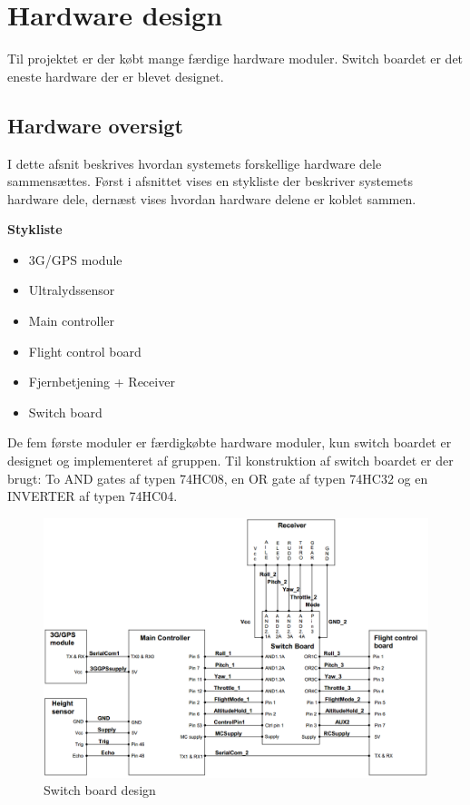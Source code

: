 \section{Hardware design}
\vspace{-0.5cm}
Til projektet er der købt mange færdige hardware moduler. Switch boardet er det eneste hardware der er blevet designet. 

\vspace{-0.3cm}

\subsection{Hardware oversigt}
I dette afsnit beskrives hvordan systemets forskellige hardware dele sammensættes.
Først i afsnittet vises en stykliste der beskriver systemets hardware dele, dernæst vises hvordan hardware delene er koblet sammen.

\textbf{Stykliste}
\begin{itemize}
	\item 3G/GPS module
	\item Ultralydssensor
	\item Main controller
	\item Flight control board
	\item Fjernbetjening + Receiver
	\item Switch board \\
\end{itemize} 

De fem første moduler er færdigkøbte hardware moduler, kun switch boardet er designet og implementeret af gruppen. Til konstruktion af switch boardet er der brugt: To AND gates af typen 74HC08, en OR gate af typen 74HC32 og en INVERTER af typen 74HC04.


\begin{figure}[H]
	\centering
	\includegraphics[width=1\textwidth]{Billeder/hardware/hardware_oversigt.png}
	\caption{Switch board design}
	\label{fig:switchboard_design}
\end{figure}

